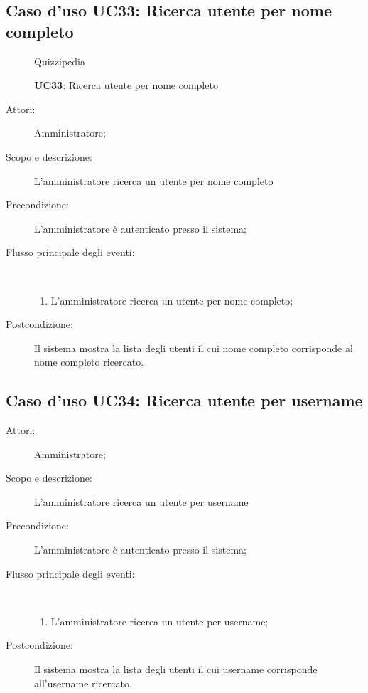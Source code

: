 \subsection{Caso d'uso UC33: Ricerca utente per nome completo}
\begin{figure}[H]
	\centering
	\begin{resizedtikzpicture}{\textwidth}
		\begin{umlsystem}[x=0, fill=lightgray!20]{Quizzipedia}
		\end{umlsystem}
	\end{resizedtikzpicture}
	\caption{\textbf{UC33}: Ricerca utente per nome completo}
	\label{UC33}
\end{figure}
\begin{description}
	\item[Attori:] Amministratore;
	\item[Scopo e descrizione:] L'amministratore ricerca un utente per nome completo
	\item[Precondizione:] L'amministratore è autenticato presso il sistema;
	
	\item[Flusso principale degli eventi:] \ 
	\begin{enumerate}
		\item L'amministratore ricerca un utente per nome completo;
		
	\end{enumerate}
	\item[Postcondizione:] Il sistema mostra la lista degli utenti il cui nome completo corrisponde al nome completo ricercato.
\end{description}
\hypertarget{UC34}{}
\subsection{Caso d'uso UC34: Ricerca utente per username}\begin{description}
	\item[Attori:] Amministratore;
	\item[Scopo e descrizione:] L'amministratore ricerca un utente per username
	\item[Precondizione:] L'amministratore è autenticato presso il sistema;
	
	\item[Flusso principale degli eventi:] \ 
	\begin{enumerate}
		\item L'amministratore ricerca un utente per username;
		
	\end{enumerate}
	\item[Postcondizione:] Il sistema mostra la lista degli utenti il cui username corrisponde all'username ricercato.
\end{description}
\hypertarget{UC35}{}
